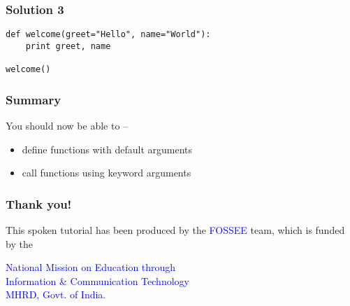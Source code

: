 \documentclass[presentation]{beamer}
\begin{document}
\begin{frame}[fragile]
\frametitle{Solution 3}
\label{sec-7}

\begin{verbatim}
def welcome(greet="Hello", name="World"):
    print greet, name

welcome()
\end{verbatim}
\end{frame}
\begin{frame}
\frametitle{Summary}
\label{sec-8}

  You should now be able to --
\begin{itemize}
\item define functions with default arguments
\item call functions using keyword arguments
\end{itemize}
\end{frame}
\begin{frame}
\frametitle{Thank you!}
\label{sec-9}

  \begin{block}{}
  \begin{center}
  This spoken tutorial has been produced by the
  \textcolor{blue}{FOSSEE} team, which is funded by the 
  \end{center}
  \begin{center}
    \textcolor{blue}{National Mission on Education through \\
      Information \& Communication Technology \\ 
      MHRD, Govt. of India}.
  \end{center}  
  \end{block}
\end{frame}
\end{document}
